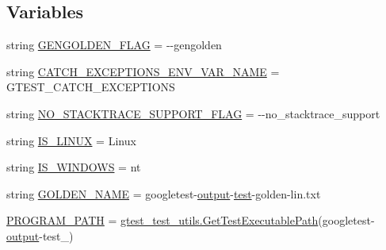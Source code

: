 \subsection*{Variables}
\begin{DoxyCompactItemize}
\item 
string \mbox{\hyperlink{namespacegoogletest-master_1_1googletest_1_1test_1_1googletest-output-test_ad135fab7145859a10cfb4396102e0aec}{G\+E\+N\+G\+O\+L\+D\+E\+N\+\_\+\+F\+L\+AG}} = \textquotesingle{}-\/-\/gengolden\textquotesingle{}
\item 
string \mbox{\hyperlink{namespacegoogletest-master_1_1googletest_1_1test_1_1googletest-output-test_a4f9e8f9373b6d46ddc079fc375a1f53d}{C\+A\+T\+C\+H\+\_\+\+E\+X\+C\+E\+P\+T\+I\+O\+N\+S\+\_\+\+E\+N\+V\+\_\+\+V\+A\+R\+\_\+\+N\+A\+ME}} = \textquotesingle{}G\+T\+E\+S\+T\+\_\+\+C\+A\+T\+C\+H\+\_\+\+E\+X\+C\+E\+P\+T\+I\+O\+NS\textquotesingle{}
\item 
string \mbox{\hyperlink{namespacegoogletest-master_1_1googletest_1_1test_1_1googletest-output-test_a358993e918d2256d325466f48896348f}{N\+O\+\_\+\+S\+T\+A\+C\+K\+T\+R\+A\+C\+E\+\_\+\+S\+U\+P\+P\+O\+R\+T\+\_\+\+F\+L\+AG}} = \textquotesingle{}-\/-\/no\+\_\+stacktrace\+\_\+support\textquotesingle{}
\item 
string \mbox{\hyperlink{namespacegoogletest-master_1_1googletest_1_1test_1_1googletest-output-test_a3de5adb5b70e7087ad52c14cf12fe073}{I\+S\+\_\+\+L\+I\+N\+UX}} = \textquotesingle{}Linux\textquotesingle{}
\item 
string \mbox{\hyperlink{namespacegoogletest-master_1_1googletest_1_1test_1_1googletest-output-test_ad9e2db1e3e3cfd312dc333e8bdce1b7d}{I\+S\+\_\+\+W\+I\+N\+D\+O\+WS}} = \textquotesingle{}nt\textquotesingle{}
\item 
string \mbox{\hyperlink{namespacegoogletest-master_1_1googletest_1_1test_1_1googletest-output-test_a54841f0cc54659ea2d823867932dd1f6}{G\+O\+L\+D\+E\+N\+\_\+\+N\+A\+ME}} = \textquotesingle{}googletest-\/\mbox{\hyperlink{namespacegoogletest-master_1_1googletest_1_1test_1_1googletest-output-test_a734f0a5bd94ba038f4350763c6977129}{output}}-\/\mbox{\hyperlink{_mutual_8h_a707ee03719e99670bf6cfdfd897b8456}{test}}-\/golden-\/lin.\+txt\textquotesingle{}
\item 
\mbox{\hyperlink{namespacegoogletest-master_1_1googletest_1_1test_1_1googletest-output-test_adf02ad1211aa7490cfa528d2122115a5}{P\+R\+O\+G\+R\+A\+M\+\_\+\+P\+A\+TH}} = \mbox{\hyperlink{namespacegoogletest-master_1_1googletest_1_1test_1_1gtest__test__utils_a78bbc69ac699e750a6a29188caa643c4}{gtest\+\_\+test\+\_\+utils.\+Get\+Test\+Executable\+Path}}(\textquotesingle{}googletest-\/\mbox{\hyperlink{namespacegoogletest-master_1_1googletest_1_1test_1_1googletest-output-test_a734f0a5bd94ba038f4350763c6977129}{output}}-\/test\+\_\+\textquotesingle{})

\end{DoxyCompactItemize}
